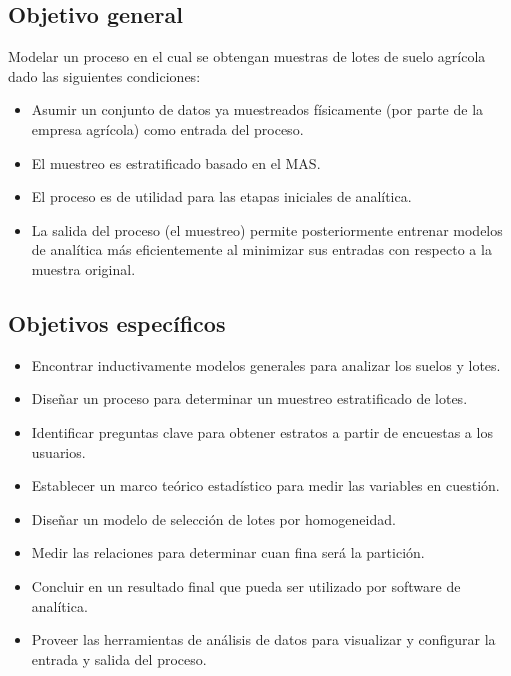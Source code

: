 \documentclass{report}
\begin{document}
\subsection{Objetivo general}

Modelar un proceso en el cual se obtengan muestras de lotes de suelo agrícola dado las siguientes condiciones:

\begin{itemize}
    \item Asumir un conjunto de datos ya muestreados físicamente (por parte de la empresa agrícola) como entrada del proceso.
    
    \item El muestreo es estratificado basado en el MAS.
    
    \item El proceso es de utilidad para las etapas iniciales de analítica.
    
    \item La salida del proceso (el muestreo) permite posteriormente entrenar modelos de analítica más eficientemente al minimizar sus entradas con respecto a la muestra original.
\end{itemize}

\subsection{Objetivos específicos}

\begin{itemize}
    \item Encontrar inductivamente modelos generales para analizar los suelos y lotes. 
    
    \item Diseñar un proceso para determinar un muestreo estratificado de lotes.
    
    \item Identificar preguntas clave para obtener estratos a partir de encuestas a los usuarios.
    
    \item Establecer un marco teórico estadístico para medir las variables en cuestión.
    
    \item Diseñar un modelo de selección de lotes por homogeneidad.
    
    \item Medir las relaciones para determinar cuan fina será la partición.
    
    \item Concluir en un resultado final que pueda ser utilizado por software de analítica.
    
    \item Proveer las herramientas de análisis de datos para visualizar y configurar la entrada y salida del proceso.
\end{itemize}
\end{document}
